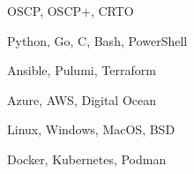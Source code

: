 \item[\textbf{Certifications}] OSCP, OSCP+, CRTO
\item[\textbf{Languages}] Python, Go, C, Bash, PowerShell
\item[\textbf{Automation}] Ansible, Pulumi, Terraform
\item[\textbf{Cloud}] Azure, AWS, Digital Ocean
\item[\textbf{OS}] Linux, Windows, MacOS, BSD
\item[\textbf{Containers}] Docker, Kubernetes, Podman